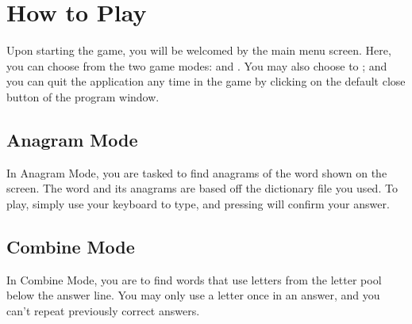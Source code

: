 \documentclass[letterpaper,10pt,english,openany,oneside]{sphinxmanual}
\begin{document}
%
\begin{sphinxVerbatim}[commandchars=\\\{\}]
    
\end{sphinxVerbatim}


\chapter{How to Play}
\label{\detokenize{index:how-to-play}}
Upon starting the game, you will be welcomed by the
main menu screen. Here, you can choose from the two
game modes:  and . You may
also choose to ; and you can quit the
application any time in the game by clicking on the default
close button of the program window.


\newpage


\section{Anagram Mode}
\label{\detokenize{index:anagram-mode}}
In Anagram Mode, you are tasked to find anagrams of the word
shown on the screen. The word and its anagrams are based off
the dictionary file you used. To play, simply use your keyboard
to type, and pressing  will confirm your answer.



\section{Combine Mode}
\label{\detokenize{index:combine-mode}}
In Combine Mode, you are to find words that use letters from
the letter pool below the answer line. You may only use a letter
once in an answer, and you can’t repeat previously correct answers.

\end{document}
